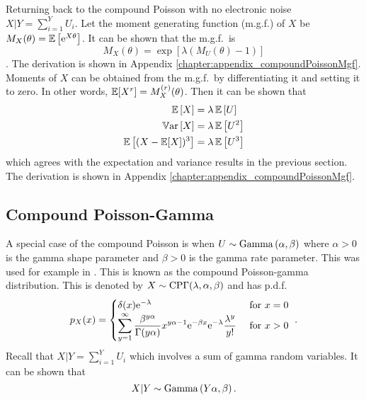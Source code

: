 Returning back to the compound Poisson with no electronic noise $X|Y = \sum_{i=1}^{Y}U_i$. Let the moment generating function (m.g.f.) of $X$ be $M_X(\theta)=\operatorname{\mathbb{E}}\left[\mathrm{e}^{X\theta}\right]$. It can be shown that the m.g.f.~is
\begin{equation}
  M_X(\theta)=
  \exp\left[
    \lambda
    \left(
      M_U(\theta)-1
    \right)
  \right]
\end{equation}
\citep{gatto2010saddlepoint}. The derivation is shown in Appendix \ref{chapter:appendix_compoundPoissonMgf}. Moments of $X$ can be obtained from the m.g.f.~by differentiating it and setting it to zero. In other words, $\operatorname{\mathbb{E}}[X^r]=M_X^{(r)}(\theta)$. Then it can be shown that
\begin{align}
  \operatorname{\mathbb{E}}\left[X\right]&=\lambda\operatorname{\mathbb{E}}\left[U\right]
  \\
  \operatorname{\mathbb{V}ar}\left[X\right] &= \lambda\operatorname{\mathbb{E}}\left[U^2\right]
  \\
  \operatorname{\mathbb{E}}\left[(X-\operatorname{\mathbb{E}}[X])^3\right] &=\lambda\operatorname{\mathbb{E}}\left[U^3\right]
\end{align}
which agrees with the expectation and variance results in the previous section. The derivation is shown in Appendix \ref{chapter:appendix_compoundPoissonMgf}.

\subsection{Compound Poisson-Gamma}

A special case of the compound Poisson is when $U\sim\operatorname{Gamma}\left(\alpha,\beta\right)$ where $\alpha>0$ is the gamma shape parameter and $\beta>0$ is the gamma rate parameter. This was used for example in \cite{xu2009electronic}. This is known as the compound Poisson-gamma distribution. This is denoted by $X\sim\operatorname{CP\Gamma}(\lambda,\alpha,\beta)$ and has p.d.f.
\begin{equation}
  p_X(x) = 
  \begin{cases}
    \delta(x) \mathrm{e}^{-\lambda} & \text{ for } x=0 \\ 
    \displaystyle\sum_{y=1}^{\infty}\dfrac{\beta^{y\alpha}}{\Gamma(y\alpha)}x^{y\alpha-1}\mathrm{e}^{-\beta x}\mathrm{e}^{-\lambda}\frac{\lambda^y}{y!} & \text{ for } x>0
  \end{cases}
  \ .
  \label{eq:compoundPoisson_pdf}
\end{equation}
Recall that $X|Y=\sum_{i=1}^YU_i$ which involves a sum of gamma random variables. It can be shown that
\begin{equation}
  X|Y\sim\operatorname{Gamma}\left(Y\alpha,\beta\right).
\end{equation}

